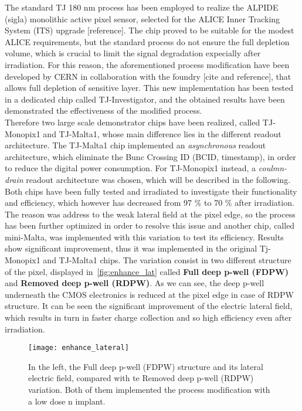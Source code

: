 The standard TJ 180 nm process has been employed to realize the ALPIDE (sigla) monolithic active pixel sensor, selected for the ALICE Inner Tracking System (ITS) upgrade [reference].
The chip proved to be suitable for the modest ALICE requirements, but the standard process do not ensure the full depletion volume, which is crucial to limit the signal degradation expecially after irradiation. For this reason, the aforementioned process modification have been developed by CERN in collaboration with the foundry [cite and reference], that allows full depletion of sensitive layer. This new implementation has been tested in a dedicated chip called TJ-Investigator, and the obtained results have been demonstrated the effectiveness of the modified process. \\
Therefore two large scale demonstrator chips have been realized, called TJ-Monopix1 and TJ-Malta1, whose main difference lies in the different readout architecture. The TJ-Malta1 chip implemented an \textit{asynchronous} readout architecture, which eliminate the Bunc Crossing ID (BCID, timestamp), in order to reduce the digital power consumption. For TJ-Monopix1 instead, a \textit{coulmn-drain} readout architecture was chosen, which will be described in the following. Both chips have been fully tested and irradiated to investigate their functionality and efficiency, which however has decreased from 97 \% to 70 \% after irradiation. The reason was address to the weak lateral field at the pixel edge, so the process has been further optimized in order to resolve this issue and another chip, called mini-Malta, was implemented with this variation to test its efficiency. Results show significant improvement, thus it was implemented in the original Tj-Monopix1 and TJ-Malta1 chips.
The variation consist in two different structure of the pixel, displayed in~\autoref{fig:enhance_lat} called \textbf{Full deep p-well (FDPW)} and \textbf{Removed deep p-well (RDPW)}. As we can see, the deep p-well underneath the CMOS electronics is reduced at the pixel edge in case of RDPW structure. It can be seen the significant improvement of the electric lateral field, which results in turn in faster charge collection and so high efficiency even after irradiation.

\begin{figure}[h!]
\centering
\texttt{[image: enhance\_lateral]}
\caption{In the left, the Full deep p-well (FDPW) structure and its lateral electric field, compared with te Removed deep p-well (RDPW) variation. Both of them implemented the process modification with a low dose n implant.}
\label{fig:enhance_lat}
\end{figure}

